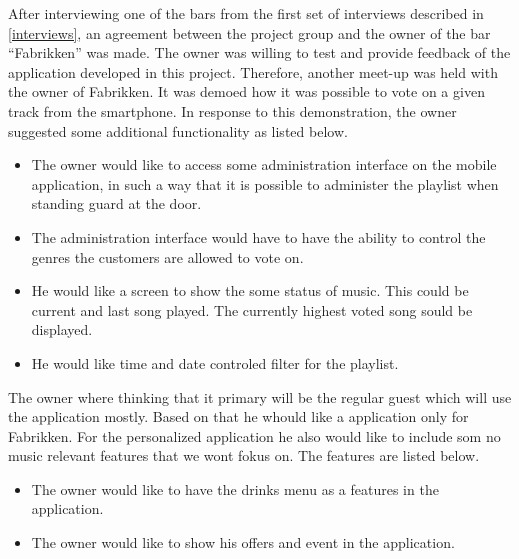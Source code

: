 After interviewing one of the bars from the first set of interviews described in \cref{interviews}, an agreement between the project group and the owner of the bar \enquote{Fabrikken} was made. The owner was willing to test and provide feedback of the application developed in this project. Therefore, another meet-up was held with the owner of Fabrikken. It was demoed how it was possible to vote on a given track from the smartphone. In response to this demonstration, the owner suggested some additional functionality as listed below.

\begin{itemize}
	\item{The owner would like to access some administration interface on the mobile application, in such a way that it is possible to administer the playlist when standing guard at the door.}
	\item{The administration interface would have to have the ability to control the genres the customers are allowed to vote on.}
	\item{He would like a screen to show the some status of music. This could be current and last song played. The currently highest voted song sould be displayed.}
	\item{He would like time and date controled filter for the playlist.}
\end{itemize}

The owner where thinking that it primary will be the regular guest which will use the application mostly. Based on that he whould like a application only for Fabrikken. For the personalized application he also would like to include som no music relevant features that we wont fokus on. The features are listed below.

\begin{itemize}
	\item {The owner would like to have the drinks menu as a features in the application.} 
	\item{The owner would like to show his offers and event in the application.}
\end{itemize}
